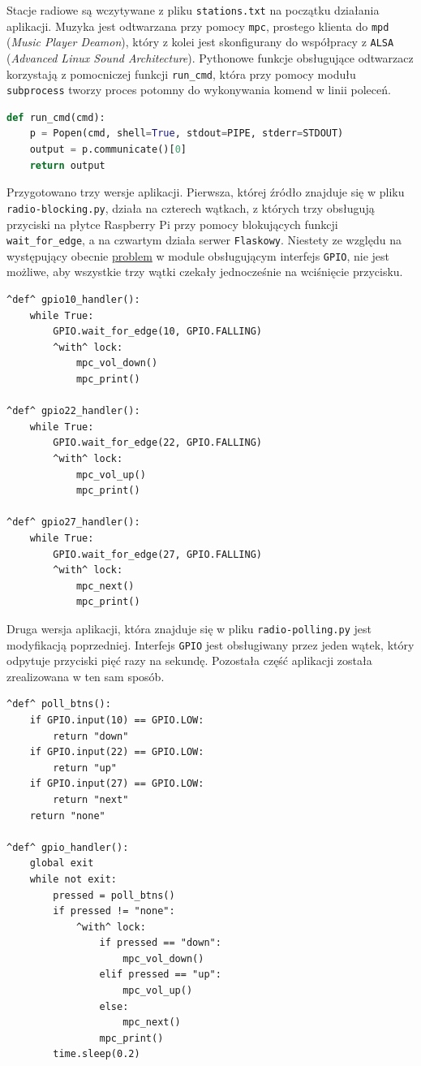 \documentclass[10pt,a4paper]{article}
\begin{document}
\noindent
Stacje radiowe są wczytywane z pliku \texttt{stations.txt} na początku działania aplikacji. Muzyka jest odtwarzana przy pomocy \texttt{mpc}, prostego klienta do \texttt{mpd} (\textit{Music Player Deamon}), który z kolei jest skonfigurany do współpracy z \texttt{ALSA} (\textit{Advanced Linux Sound Architecture}). Pythonowe funkcje obsługujące odtwarzacz korzystają z pomocniczej funkcji \texttt{run\_cmd}, która przy pomocy modułu \texttt{subprocess} tworzy proces potomny do wykonywania komend w linii poleceń.
\begin{lstlisting}[style=bash, language=python, caption={Funkcja pomocnicza run\_cmd}]
def run_cmd(cmd):
    p = Popen(cmd, shell=True, stdout=PIPE, stderr=STDOUT)
    output = p.communicate()[0]
    return output
\end{lstlisting}
Przygotowano trzy wersje aplikacji. Pierwsza, której źródło znajduje się w pliku \texttt{radio-blocking.py}, działa na czterech wątkach, z których trzy obsługują przyciski na płytce Raspberry Pi przy pomocy blokujących funkcji \texttt{wait\_for\_edge}, a na czwartym działa serwer \texttt{Flaskowy}. Niestety ze względu na występujący obecnie \href{https://sourceforge.net/p/raspberry-gpio-python/tickets/103/}{problem} w module obsługującym interfejs \texttt{GPIO}, nie jest możliwe, aby wszystkie trzy wątki czekały jednocześnie na wciśnięcie przycisku.
\begin{lstlisting}[style=bash, caption={Funkcje obsługujące interfejs GPIO (z radio-blocking.py)}]
^def^ gpio10_handler():
    while True:
        GPIO.wait_for_edge(10, GPIO.FALLING)
        ^with^ lock:
            mpc_vol_down()
            mpc_print()

^def^ gpio22_handler():
    while True:
        GPIO.wait_for_edge(22, GPIO.FALLING)
        ^with^ lock:
            mpc_vol_up()
            mpc_print()

^def^ gpio27_handler():
    while True:
        GPIO.wait_for_edge(27, GPIO.FALLING)
        ^with^ lock:
            mpc_next()
            mpc_print()
\end{lstlisting}
Druga wersja aplikacji, która znajduje się w pliku \texttt{radio-polling.py} jest modyfikacją poprzedniej. Interfejs \texttt{GPIO} jest obsługiwany przez jeden wątek, który odpytuje przyciski pięć razy na sekundę. Pozostała część aplikacji została zrealizowana w ten sam sposób.
\begin{lstlisting}[style=bash, caption={Funkcje obsługujące interfejs GPIO (z radio-polling.py)}]
^def^ poll_btns():
    if GPIO.input(10) == GPIO.LOW:
        return "down"
    if GPIO.input(22) == GPIO.LOW:
        return "up"
    if GPIO.input(27) == GPIO.LOW:
        return "next"
    return "none"

^def^ gpio_handler():
    global exit
    while not exit:
        pressed = poll_btns()
        if pressed != "none":
            ^with^ lock:
                if pressed == "down":
                    mpc_vol_down()
                elif pressed == "up":
                    mpc_vol_up()
                else:
                    mpc_next()
                mpc_print()
        time.sleep(0.2)
\end{lstlisting}
\end{document}
